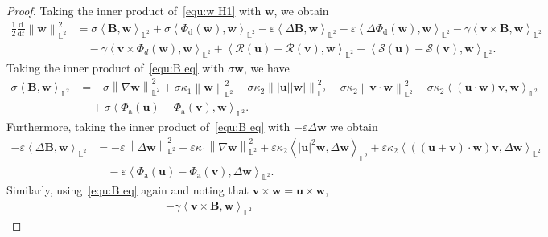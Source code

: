 \documentclass[11pt, reqno]{amsart}
\theoremstyle{definition}
\numberwithin{equation}{section}
\newcommand{\bff}{\boldsymbol}
\newcommand{\bb}{\mathbb}
\newcommand{\ddt}{\frac{\mathrm{d}}{\mathrm{d}t}}
\newcommand{\norm}[2]{\left\|{#1}\right\|_{#2}}
\newcommand{\inpro}[2]{\left\langle#1,#2\right\rangle}
\begin{document}
\begin{proof}
Taking the inner product of~\eqref{equ:w H1} with $\bff{w}$, we obtain
\begin{align}\label{equ:12 w L2}
    \frac12 \ddt \norm{\bff{w}}{\bb{L}^2}^2
    &=
    \sigma \inpro{\bff{B}}{\bff{w}}_{\bb{L}^2}
    +
    \sigma \inpro{\Phi_{\mathrm{d}}(\bff{w})}{\bff{w}}_{\bb{L}^2}
    -
    \varepsilon \inpro{\Delta \bff{B}}{\bff{w}}_{\bb{L}^2}
    -
    \varepsilon \inpro{\Delta \Phi_{\mathrm{d}}(\bff{w})}{\bff{w}}_{\bb{L}^2}
    -
    \gamma \inpro{\bff{v}\times \bff{B}}{\bff{w}}_{\bb{L}^2}
    \nonumber \\
    &\quad
    -
    \gamma \inpro{\bff{v}\times \Phi_d(\bff{w})}{\bff{w}}_{\bb{L}^2}
    +
    \inpro{\mathcal{R}(\bff{u})-\mathcal{R}(\bff{v})}{\bff{w}}_{\bb{L}^2}
    +
    \inpro{\mathcal{S}(\bff{u})-\mathcal{S}(\bff{v})}{\bff{w}}_{\bb{L}^2}.
\end{align}
Taking the inner product of~\eqref{equ:B eq} with $\sigma\bff{w}$, we have
\begin{align}\label{equ:B dot w}
    \sigma \inpro{\bff{B}}{\bff{w}}_{\bb{L}^2}
    &=
    -\sigma \norm{\nabla \bff{w}}{\bb{L}^2}^2
    +
    \sigma \kappa_1 \norm{\bff{w}}{\bb{L}^2}^2
    -
    \sigma \kappa_2 \norm{|\bff{u}||\bff{w}|}{\bb{L}^2}^2
    -
    \sigma \kappa_2 \norm{\bff{v}\cdot \bff{w}}{\bb{L}^2}^2
    -
    \sigma\kappa_2 \inpro{(\bff{u}\cdot \bff{w})\bff{v}}{\bff{w}}_{\bb{L}^2}
    \nonumber \\
    &\quad
    +
    \sigma \inpro{\Phi_{\mathrm{a}}(\bff{u})-\Phi_{\mathrm{a}}(\bff{v})}{\bff{w}}_{\bb{L}^2}.
\end{align}
Furthermore, taking the inner product of~\eqref{equ:B eq} with $-\varepsilon\Delta \bff{w}$ we obtain
\begin{align}\label{equ:Delta B dot w}
    -\varepsilon \inpro{\Delta \bff{B}}{\bff{w}}_{\bb{L}^2}
    &=
    -\varepsilon \norm{\Delta \bff{w}}{\bb{L}^2}^2
    +
    \varepsilon \kappa_1 \norm{\nabla \bff{w}}{\bb{L}^2}^2
    +
    \varepsilon\kappa_2 \inpro{|\bff{u}|^2 \bff{w}}{\Delta \bff{w}}_{\bb{L}^2}
    +
    \varepsilon \kappa_2 \inpro{((\bff{u}+\bff{v})\cdot\bff{w})\bff{v}}{\Delta\bff{w}}_{\bb{L}^2}
    \nonumber\\
    &\quad
    -
    \varepsilon \inpro{\Phi_{\mathrm{a}}(\bff{u})-\Phi_{\mathrm{a}}(\bff{v})}{\Delta \bff{w}}_{\bb{L}^2}.
\end{align}
Similarly, using~\eqref{equ:B eq} again and noting that $\bff{v}\times \bff{w}=\bff{u}\times \bff{w}$,
\begin{align}\label{equ:v cross B w}
    -\gamma \inpro{\bff{v}\times \bff{B}}{\bff{w}}_{\bb{L}^2}

\end{align}
\end{proof}
\end{document}
